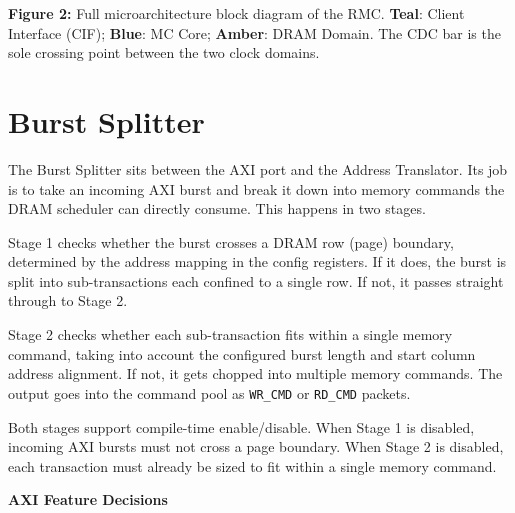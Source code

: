 \documentclass[10pt]{article}
\begin{document}
\vspace{8pt}
{\small\textbf{Figure 2:} Full microarchitecture block diagram of the RMC.
\textcolor{CliD}{\textbf{Teal}}: Client Interface (CIF);
\textcolor{MCD}{\textbf{Blue}}: MC Core;
\textcolor{DrmD}{\textbf{Amber}}: DRAM Domain.
The CDC bar is the sole crossing point between the two clock domains.}

\section{Burst Splitter}

The Burst Splitter sits between the AXI port and the Address Translator. Its job is to take an incoming AXI burst and break it down into memory commands the DRAM scheduler can directly consume. This happens in two stages.

Stage 1 checks whether the burst crosses a DRAM row (page) boundary, determined by the address mapping in the config registers. If it does, the burst is split into sub-transactions each confined to a single row. If not, it passes straight through to Stage 2.

Stage 2 checks whether each sub-transaction fits within a single memory command, taking into account the configured burst length and start column address alignment. If not, it gets chopped into multiple memory commands. The output goes into the command pool as \texttt{WR\_CMD} or \texttt{RD\_CMD} packets.

Both stages support compile-time enable/disable. When Stage 1 is disabled, incoming AXI bursts must not cross a page boundary. When Stage 2 is disabled, each transaction must already be sized to fit within a single memory command.

\noindent\textbf{\color{DfiD}AXI Feature Decisions}\par\vspace{6pt}
\end{document}
